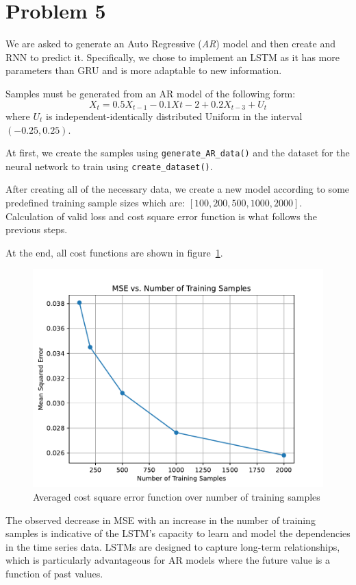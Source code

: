 \section{Problem 5}

We are asked to generate an Auto Regressive (\textit{AR}) model and then create and RNN to predict it. 
Specifically, we chose to implement an LSTM as it has more parameters than GRU and is more adaptable to new information.

Samples must be generated from an AR model of the following form:
\[
X_t = 0.5 X_{t-1} - 0.1 X{t-2} + 0.2 X_{t-3} + U_t
\]
where $U_t$ is independent-identically distributed Uniform in the interval $\left( -0.25, 0.25 \right)$.

At first, we create the samples using \verb|generate_AR_data()| and the dataset for the neural network to train using \verb|create_dataset()|.

After creating all of the necessary data, we create a new model according to some predefined training sample sizes which are: $\left[100, 200, 500, 1000, 2000\right]$.
Calculation of valid loss and cost square error function is what follows the previous steps.

At the end, all cost functions are shown in figure~\ref{fig:prob5_mse}.

\begin{figure}[htpb]
	\centering
	\includegraphics[width=0.5\linewidth]{../Problem 5/prob5_mse_vs_total_epoch.pdf}
	\caption{Averaged cost square error function over number of training samples}
	\label{fig:prob5_mse}
\end{figure}

The observed decrease in MSE with an increase in the number of training samples is indicative of the LSTM's capacity to learn and model the dependencies in the time series data. LSTMs are designed to capture long-term relationships, which is particularly advantageous for AR models where the future value is a function of past values.


